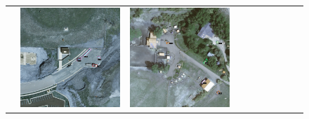 \begin{figure}[H]
\begin{tabularx}{\textwidth}{c|*{9}{X}}
    & \includegraphics[trim={440pt 360pt 460pt 555pt},clip,width=\linewidth]{images/015Results/02perm_exp/comp_images/rgbndvi/427.png}
    & \includegraphics[trim={740pt 420pt 180pt 510pt},clip,width=\linewidth]{images/015Results/02perm_exp/comp_images/rgbndvi/523.png}

\end{tabularx}
\end{figure}
